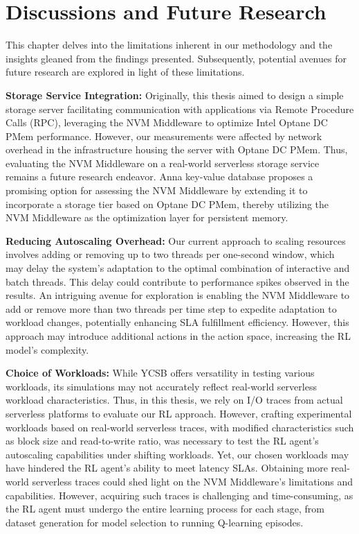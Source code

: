 \chapter{Discussions and Future Research}

This chapter delves into the limitations inherent in our methodology and the insights gleaned from the findings presented. Subsequently, potential avenues for future research are explored in light of these limitations.

\textbf{Storage Service Integration:} Originally, this thesis aimed to design a simple storage server facilitating communication with applications via Remote Procedure Calls (RPC), leveraging the NVM Middleware to optimize Intel Optane DC PMem performance. However, our measurements were affected by network overhead in the infrastructure housing the server with Optane DC PMem. Thus, evaluating the NVM Middleware on a real-world serverless storage service remains a future research endeavor. Anna key-value database \cite{wu2019anna} proposes a promising option for assessing the NVM Middleware by extending it to incorporate a storage tier based on Optane DC PMem, thereby utilizing the NVM Middleware as the optimization layer for persistent memory.

\textbf{Reducing Autoscaling Overhead:} Our current approach to scaling resources involves adding or removing up to two threads per one-second window, which may delay the system's adaptation to the optimal combination of interactive and batch threads. This delay could contribute to performance spikes observed in the results. An intriguing avenue for exploration is enabling the NVM Middleware to add or remove more than two threads per time step to expedite adaptation to workload changes, potentially enhancing SLA fulfillment efficiency. However, this approach may introduce additional actions in the action space, increasing the RL model's complexity.

\textbf{Choice of Workloads:} While YCSB offers versatility in testing various workloads, its simulations may not accurately reflect real-world serverless workload characteristics. Thus, in this thesis, we rely on I/O traces from actual serverless platforms to evaluate our RL approach. However, crafting experimental workloads based on real-world serverless traces, with modified characteristics such as block size and read-to-write ratio, was necessary to test the RL agent's autoscaling capabilities under shifting workloads. Yet, our chosen workloads may have hindered the RL agent's ability to meet latency SLAs. Obtaining more real-world serverless traces could shed light on the NVM Middleware's limitations and capabilities. However, acquiring such traces is challenging and time-consuming, as the RL agent must undergo the entire learning process for each stage, from dataset generation for model selection to running Q-learning episodes.

